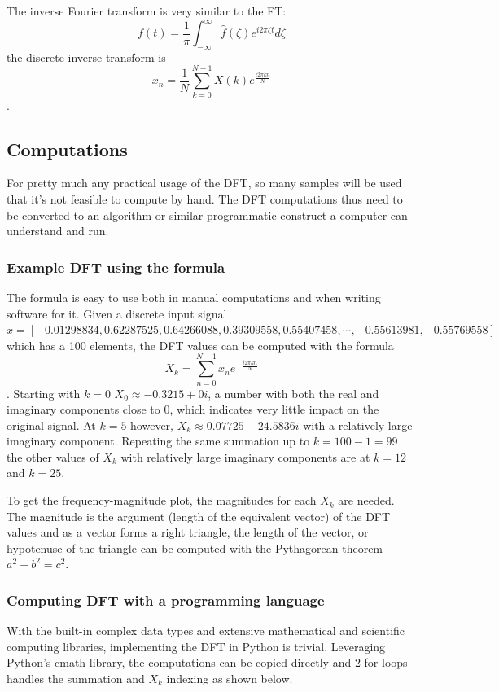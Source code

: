 The inverse Fourier transform is very similar to the FT:
$$ f(t) = \frac{1}{\pi}\int_{-\infty}^{\infty} \hat{f}(\zeta)e^{i2\pi\zeta t} d\zeta$$
the discrete inverse transform is 
$$ x_n = \frac{1}{N}\sum_{k=0}^{N-1} X(k)e^{\frac{i2\pi kn}{N}}$$.

\subsection{Computations}
For pretty much any practical usage of the DFT, so many samples will be used that it's not feasible to compute by hand. The DFT computations thus need to be converted to an algorithm or similar programmatic construct a computer can understand and run.
\subsubsection{Example DFT using the formula}
The formula is easy to use both in manual computations and when writing software for it. Given a discrete input signal $x = [-0.01298834,  0.62287525,  0.64266088,  0.39309558,  0.55407458, \cdots , -0.55613981, -0.55769558]$ which has a 100 elements, the DFT values can be computed with the formula $$X_k = \sum_{n=0}^{N-1} x_ne^{-\frac{i2\pi kn}{N}}$$. Starting with $k=0$ $X_0 \approx -0.3215+0i$, a number with both the real and imaginary components close to 0, which indicates very little impact on the original signal. At $k=5$ however, $X_k \approx 0.07725-24.5836i$ with a relatively large imaginary component. Repeating the same summation up to $k=100-1 = 99$ the other values of $X_k$ with relatively large imaginary components are at $k=12$ and $k=25$. 

To get the frequency-magnitude plot, the magnitudes for each $X_k$ are needed. The magnitude is the argument (length of the equivalent vector) of the DFT values and as a vector forms a right triangle, the length of the vector, or hypotenuse of the triangle can be computed with the Pythagorean theorem $a^2 + b^2 = c^2$. 


\subsubsection{Computing DFT with a programming language}
With the built-in complex data types and extensive mathematical and scientific computing libraries, implementing the DFT in Python is trivial. Leveraging Python's cmath library, the computations can be copied directly and 2 for-loops handles the summation and $X_k$ indexing as shown below.

